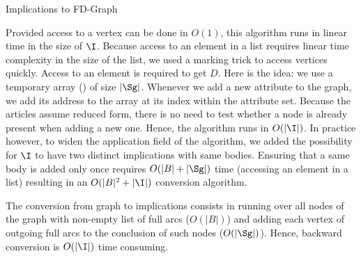 \begin{algorithm}

\BlankLine
\BlankLine



\BlankLine


\caption{Implications to FD-Graph}
\label{alg:conv-imp-graph}
\end{algorithm}


Provided access to a vertex can be done in $O(1)$, this algorithm runs in linear
time in the size of $\I$. Because access to an element in a list requires linear
time complexity in the size of the list, we used a marking trick to access 
vertices quickly. Access to an element is required to get $D$. Here is the 
idea: we use a temporary array () of size $|\Sg|$. Whenever we 
add a new attribute to the graph, we add its address to the array at its index
within the attribute set. Because the articles assume reduced form, there is no 
need to test whether a node is already present when adding a new one. Hence, 
the algorithm runs in $O(|\I|)$. In practice however, to widen the application 
field of the algorithm, we added the possibility for $\I$ to have two distinct 
implications with same bodies. Ensuring that a same body is added only once 
requires $O(|B| + |\Sg|)$ time (accessing an element in a list) resulting in an 
$O(|B|^2 + |\I|)$ conversion algorithm.

\vspace{1.2em}

The conversion from graph to implications consists in running over all nodes 
of the graph with non-empty list of full arcs ($O(|B|)$) and adding each vertex
of outgoing full arcs to the conclusion of such nodes ($O(|\Sg|)$). Hence, 
backward conversion is $O(|\I|)$ time consuming.

\vspace{1.2em}

